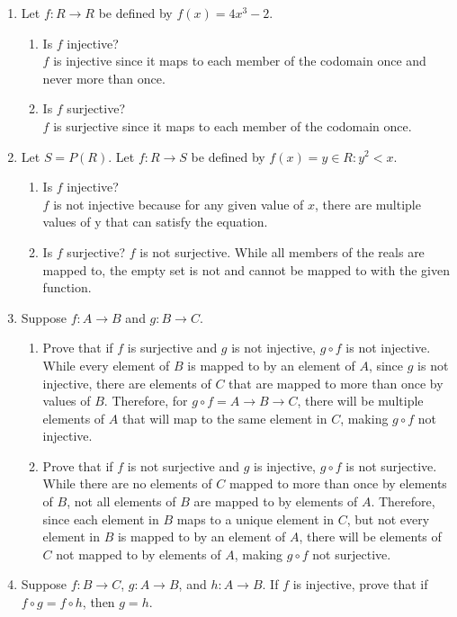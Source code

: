 \documentclass{article}
\begin{document}
\begin{enumerate}
\item Let $f: R \rightarrow R$ be defined by $f(x) = 4x^3-2$.
    \begin{enumerate}
    \item Is $f$ injective? \\
       $f$ is injective since it maps to each member of the codomain once and never more than once.  
    \item Is $f$ surjective? \\
       $f$ is surjective since it maps to each member of the codomain once.  
    \end{enumerate}
\item Let $S = P(R)$. Let $f: R \to S$ be defined by $f(x) = {y \in R: y^2 < x}$.
    \begin{enumerate}
    \item Is $f$ injective? \\
        $f$ is not injective because for any given value of $x$, there are multiple values of y that can satisfy the equation. 
    \item Is $f$ surjective?
        $f$ is not surjective. While all members of the reals are mapped to, the empty set is not and cannot be mapped to with the given function. 
    \end{enumerate}
\item Suppose $f: A \to B$ and $g: B \to C$. 
    \begin{enumerate}
    \item Prove that if $f$ is surjective and $g$ is not injective, $g \circ f$ is not injective. \\
        While every element of $B$ is mapped to by an element of $A$, since $g$ is not injective, there are elements of $C$ that are mapped to more than once by values of $B$. Therefore, for $g \circ f = A \to B \to C$, there will be multiple elements of $A$ that will map to the same element in $C$, making $g \circ f$ not injective.
    \item Prove that if $f$ is not surjective and $g$ is injective, $g \circ f$ is not surjective. \\
    While there are no elements of $C$ mapped to more than once by elements of $B$, not all elements of $B$ are mapped to by elements of $A$. Therefore, since each element in $B$ maps to a unique element in $C$, but not every element in $B$ is mapped to by an element of $A$, there will be elements of $C$ not mapped to by elements of $A$, making $g \circ f$ not surjective.
    \end{enumerate}
\item Suppose $f: B \to C$, $g: A \to B$, and $h: A \to B$. If $f$ is injective, prove that if $f \circ g = f \circ h$, then $g=h$. 
\end{enumerate}
\end{document}

